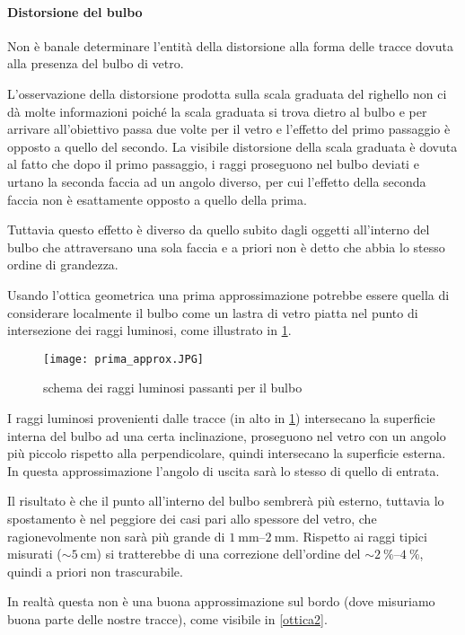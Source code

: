 \paragraph{Distorsione del bulbo} Non è banale determinare l'entità della distorsione alla forma delle tracce dovuta alla presenza del bulbo di vetro.

L'osservazione della distorsione prodotta sulla scala graduata del righello non ci dà molte informazioni poiché la scala graduata si trova dietro al bulbo e per arrivare all'obiettivo passa due volte per il vetro e l'effetto del primo passaggio è opposto a quello del secondo. La visibile distorsione della scala graduata è dovuta al fatto che dopo il primo passaggio, i raggi proseguono  nel bulbo deviati e urtano la seconda faccia ad un angolo diverso, per cui l'effetto della seconda faccia non è esattamente opposto a quello della prima.

Tuttavia questo effetto è diverso da quello subito dagli oggetti all'interno del bulbo che attraversano una sola faccia e a priori non è detto che abbia lo stesso ordine di grandezza.

Usando l'ottica geometrica una prima approssimazione potrebbe essere quella di considerare localmente il bulbo come un lastra di vetro piatta nel punto di intersezione dei raggi luminosi, come illustrato in \figurename{ \ref{ottica1}}.

\begin{figure}[H]
	\centering
	\texttt{[image: prima\_approx.JPG]}
	\caption{schema dei raggi luminosi passanti per il bulbo}
	\label{ottica1}
\end{figure}

I raggi luminosi provenienti dalle tracce (in alto in \figurename{ \ref{ottica1}}) intersecano la superficie interna del bulbo ad una certa inclinazione, proseguono nel vetro con un angolo più piccolo rispetto alla perpendicolare, quindi intersecano la superficie esterna. In questa approssimazione l'angolo di uscita sarà lo stesso di quello di entrata.

Il risultato è che il punto all'interno del bulbo sembrerà più esterno, tuttavia lo spostamento è nel peggiore dei casi pari allo spessore del vetro, che ragionevolmente non sarà più grande di $\SIrange{1}{2}{\mm}$. Rispetto ai raggi tipici misurati ($\sim \SI{5}{\cm}$) si tratterebbe di una correzione dell'ordine del $\sim \SIrange{2}{4}{\percent}$, quindi a priori non trascurabile.

In realtà questa non è una buona approssimazione sul bordo (dove misuriamo buona parte delle nostre tracce), come visibile in \figurename{ \ref{ottica2}}.

